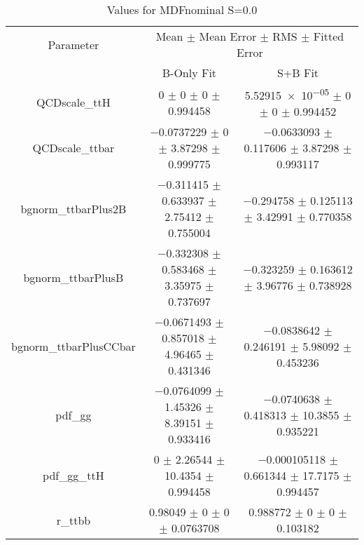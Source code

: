 \begin{table}
\centering
\caption{Values for MDFnominal S=0.0}
\begin{tabular}{ccc}
\toprule
Parameter & \multicolumn{2}{c}{Mean $\pm$ Mean Error $\pm$ RMS $\pm$ Fitted Error}\\
 & B-Only Fit & S+B Fit\\
\midrule
QCDscale\_ttH & \num{0} $\pm$ \num{0} $\pm$ \num{0} $\pm$ \num{0.994458} & \num{5.52915e-05} $\pm$ \num{0} $\pm$ \num{0} $\pm$ \num{0.994452}\\
QCDscale\_ttbar & \num{-0.0737229} $\pm$ \num{0} $\pm$ \num{3.87298} $\pm$ \num{0.999775} & \num{-0.0633093} $\pm$ \num{0.117606} $\pm$ \num{3.87298} $\pm$ \num{0.993117}\\
bgnorm\_ttbarPlus2B & \num{-0.311415} $\pm$ \num{0.633937} $\pm$ \num{2.75412} $\pm$ \num{0.755004} & \num{-0.294758} $\pm$ \num{0.125113} $\pm$ \num{3.42991} $\pm$ \num{0.770358}\\
bgnorm\_ttbarPlusB & \num{-0.332308} $\pm$ \num{0.583468} $\pm$ \num{3.35975} $\pm$ \num{0.737697} & \num{-0.323259} $\pm$ \num{0.163612} $\pm$ \num{3.96776} $\pm$ \num{0.738928}\\
bgnorm\_ttbarPlusCCbar & \num{-0.0671493} $\pm$ \num{0.857018} $\pm$ \num{4.96465} $\pm$ \num{0.431346} & \num{-0.0838642} $\pm$ \num{0.246191} $\pm$ \num{5.98092} $\pm$ \num{0.453236}\\
pdf\_gg & \num{-0.0764099} $\pm$ \num{1.45326} $\pm$ \num{8.39151} $\pm$ \num{0.933416} & \num{-0.0740638} $\pm$ \num{0.418313} $\pm$ \num{10.3855} $\pm$ \num{0.935221}\\
pdf\_gg\_ttH & \num{0} $\pm$ \num{2.26544} $\pm$ \num{10.4354} $\pm$ \num{0.994458} & \num{-0.000105118} $\pm$ \num{0.661344} $\pm$ \num{17.7175} $\pm$ \num{0.994457}\\
r\_ttbb & \num{0.98049} $\pm$ \num{0} $\pm$ \num{0} $\pm$ \num{0.0763708} & \num{0.988772} $\pm$ \num{0} $\pm$ \num{0} $\pm$ \num{0.103182}\\
\bottomrule
\end{tabular}
\end{table}